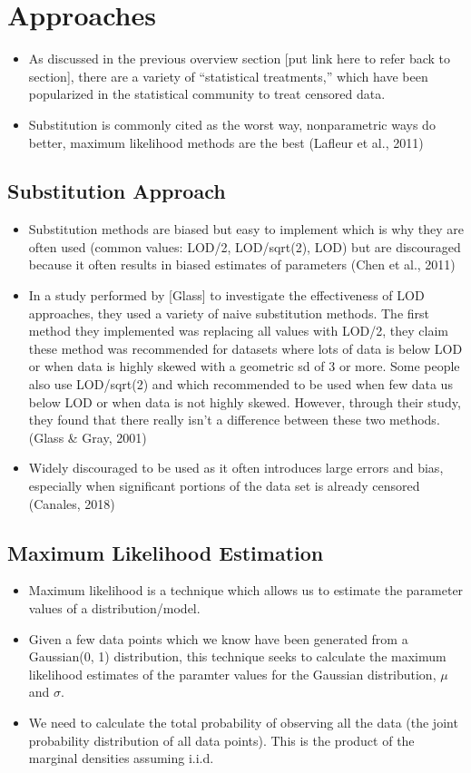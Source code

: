 \documentclass[12pt, twoside]{amherstthesis}
\begin{document}
\hypertarget{Approaches}{%
\section{Approaches}\label{Approaches}}
\begin{itemize}
\item
  As discussed in the previous overview section {[}put link here to refer back to section{]}, there are a variety of ``statistical treatments,'' which have been popularized in the statistical community to treat censored data.
\item
  Substitution is commonly cited as the worst way, nonparametric ways do better, maximum likelihood methods are the best (Lafleur et al., 2011)
\end{itemize}
\hypertarget{Substitution}{%
\subsection{Substitution Approach}\label{Substitution}}
\begin{itemize}
\item
  Substitution methods are biased but easy to implement which is why they are often used (common values: LOD/2, LOD/sqrt(2), LOD) but are discouraged because it often results in biased estimates of parameters (Chen et al., 2011)
\item
  In a study performed by {[}Glass{]} to investigate the effectiveness of LOD approaches, they used a variety of naive substitution methods. The first method they implemented was replacing all values with LOD/2, they claim these method was recommended for datasets where lots of data is below LOD or when data is highly skewed with a geometric sd of 3 or more. Some people also use LOD/sqrt(2) and which recommended to be used when few data us below LOD or when data is not highly skewed. However, through their study, they found that there really isn't a difference between these two methods. (Glass \& Gray, 2001)
\item
  Widely discouraged to be used as it often introduces large errors and bias, especially when significant portions of the data set is already censored (Canales, 2018)
\end{itemize}
\hypertarget{MLE}{%
\subsection{Maximum Likelihood Estimation}\label{MLE}}
\begin{itemize}
\item
  Maximum likelihood is a technique which allows us to estimate the parameter values of a distribution/model.
\item
  Given a few data points which we know have been generated from a Gaussian(0, 1) distribution, this technique seeks to calculate the maximum likelihood estimates of the paramter values for the Gaussian distribution, \(\mu\) and \(\sigma\).
\item
  We need to calculate the total probability of observing all the data (the joint probability distribution of all data points). This is the product of the marginal densities assuming i.i.d.
\end{itemize}
\end{document}
